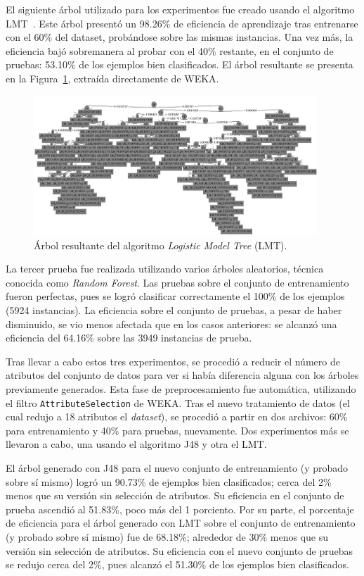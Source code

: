 \documentclass{llncs}
\begin{document}
El siguiente árbol utilizado para los experimentos fue creado usando el algoritmo LMT~\cite{Landwehr2005}.
Este árbol presentó un 98.26\% de eficiencia de aprendizaje tras entrenarse con el 60\% del dataset, probándose sobre las mismas instancias.
Una vez más, la eficiencia bajó sobremanera al probar con el 40\% restante, en el conjunto de pruebas:
53.10\% de los ejemplos bien clasificados.
El árbol resultante se presenta en la Figura~\ref{fig:lmt}, extraída directamente de WEKA.

\begin{figure}[htbp]
	\centering
	\includegraphics[width=0.95\textwidth]{05-lmt}
	\caption{Árbol resultante del algoritmo \textit{Logistic Model Tree} (LMT).}
	\label{fig:lmt}
\end{figure}

La tercer prueba fue realizada utilizando varios árboles aleatorios, técnica conocida como \textit{Random Forest}.
Las pruebas sobre el conjunto de entrenamiento fueron perfectas,
pues se logró clasificar correctamente el 100\% de los ejemplos (5924 instancias).
La eficiencia sobre el conjunto de pruebas, a pesar de haber disminuido,
se vio menos afectada que en los casos anteriores:
se alcanzó una eficiencia del 64.16\% sobre las 3949 instancias de prueba.

Tras llevar a cabo estos tres experimentos, se procedió a reducir el número de atributos del conjunto de datos para ver si había diferencia alguna con los árboles previamente generados.
Esta fase de preprocesamiento fue automática, utilizando el filtro \texttt{AttributeSelection} de WEKA.
Tras el nuevo tratamiento de datos (el cual redujo a 18 atributos el \textit{dataset}),
se procedió a partir en dos archivos: 60\% para entrenamiento y 40\% para pruebas, nuevamente.
Dos experimentos más se llevaron a cabo, una usando el algoritmo J48 y otra el LMT.

El árbol generado con J48 para el nuevo conjunto de entrenamiento (y probado sobre sí mismo)
logró un 90.73\% de ejemplos bien clasificados; cerca del 2\% menos que su versión sin selección de atributos.
Su eficiencia en el conjunto de prueba ascendió al 51.83\%, poco más del 1 porciento.
Por su parte, el porcentaje de eficiencia para el árbol generado con LMT sobre el conjunto de entrenamiento (y probado sobre sí mismo)
fue de 68.18\%; alrededor de 30\% menos que su versión sin selección de atributos.
Su eficiencia con el nuevo conjunto de pruebas se redujo cerca del 2\%,
pues alcanzó el 51.30\% de los ejemplos bien clasificados.
\end{document}
